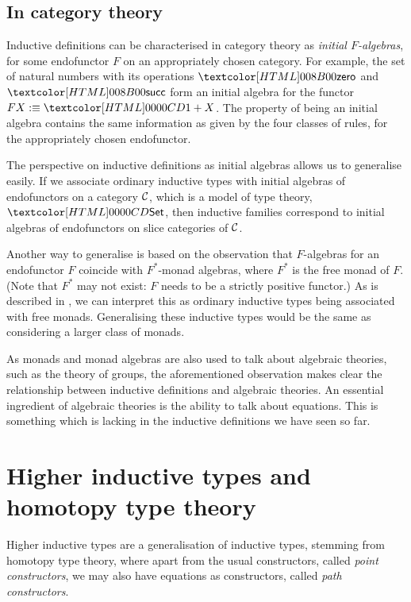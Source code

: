 \subsection{In category theory}
\label{in-category-theory}

Inductive definitions can be characterised in category theory as
\emph{initial $F$-algebras}, for some endofunctor $F$ on an
appropriately chosen category. For example, the set of natural numbers
with its operations $\natzero$ and $\natsucc$ form an initial algebra
for the functor $F X \ddefeq \unitty + X$. The property of being an
initial algebra contains the same information as given by the four
classes of rules, for the appropriately chosen endofunctor. 

The perspective on inductive definitions as initial algebras allows us
to generalise easily. If we associate ordinary inductive types with
initial algebras of endofunctors on a category $\mathcal{C}$, which is a model
of type theory, \eg $\Set$, then inductive families correspond to
initial algebras of endofunctors on slice categories of
$\mathcal{C}$. 


Another way to generalise is based on the observation that
$F$-algebras for an endofunctor $F$ coincide with $F^*$-monad
algebras, where $F^*$ is the free monad of $F$. (Note that $F^*$ may
not exist: $F$ needs to be a strictly positive functor.) As is
described in \cite{Shulman2011}, we can interpret this as ordinary
inductive types being associated with free monads. Generalising these
inductive types would be the same as considering a larger class of monads. 

As monads and monad algebras are also used to talk about algebraic
theories, such as the theory of groups, the aforementioned observation
makes clear the relationship between inductive definitions and
algebraic theories. An essential ingredient of algebraic theories is
the ability to talk about equations. This is something which is
lacking in the inductive definitions we have seen so far.

\section{Higher inductive types and homotopy type theory}

Higher inductive types are a generalisation of inductive types,
stemming from homotopy type theory, where apart from the usual
constructors, called \emph{point constructors}, we may also have
equations as constructors, called \emph{path constructors}.

